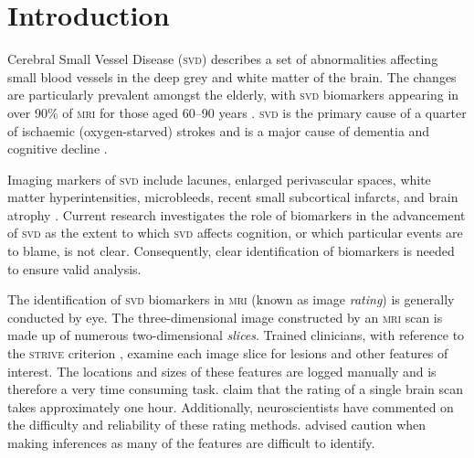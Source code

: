 %
%

\chapter{Introduction}\label{s-intro}

{\noindent} Cerebral Small Vessel Disease (\textsc{svd}) describes a set of abnormalities affecting small blood vessels in the deep grey and white matter of the brain. The changes are particularly prevalent amongst the elderly, with \textsc{svd} biomarkers appearing in over 90\% of \textsc{mri} for those aged 60--90 years \citep{deLeeuwF-E2001Pocw}. \textsc{svd} is the primary cause of a quarter of ischaemic (oxygen-starved) strokes \citep{WardlawJ.M.2013Nsfr} and is a major cause of dementia and cognitive decline \citep{NorrvingBo2008Linb}.

Imaging markers of \textsc{svd} include lacunes, enlarged perivascular spaces, white matter hyperintensities, microbleeds, recent small subcortical infarcts, and brain atrophy \citep{WardlawJ.M.2013Nsfr}. Current research investigates the role of  biomarkers in the advancement of \textsc{svd} as the extent to which \textsc{svd} affects cognition, or which particular events are to blame, is not clear. Consequently, clear identification of biomarkers is needed to ensure valid analysis.

The identification of \textsc{svd} biomarkers in \textsc{mri} (known as image \textit{rating}) is generally conducted by eye. The three-dimensional image constructed by an \textsc{mri} scan is made up of numerous two-dimensional \textit{slices}. Trained clinicians, with reference to the \textsc{strive} criterion \citep{WardlawJ.M.2013Nsfr}, examine each image slice for lesions and other features of interest. The locations and sizes of these features are logged manually and is therefore a very time consuming task. \cite{Heuvel2016} claim that the rating of a single brain scan takes approximately one hour. Additionally, neuroscientists have commented on the difficulty and reliability of these rating methods. \cite{WardlawJm2013Mosc} advised caution when making inferences as many of the features are difficult to identify. 

%

